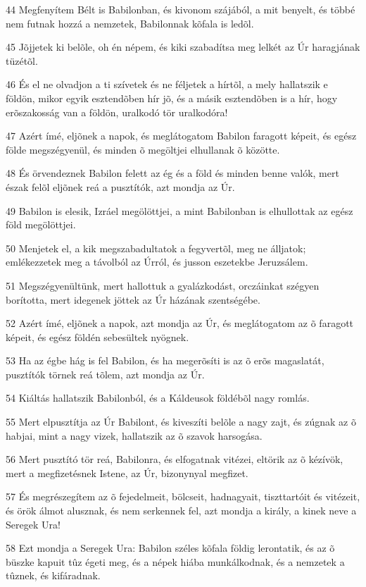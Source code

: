 \par 44 Megfenyítem Bélt is Babilonban, és kivonom szájából, a mit benyelt, és többé nem futnak hozzá a nemzetek, Babilonnak kõfala is ledõl.
\par 45 Jõjjetek ki belõle, oh én népem, és kiki szabadítsa meg lelkét az Úr haragjának tüzétõl.
\par 46 És el ne olvadjon a ti szívetek és ne féljetek a hírtõl, a mely hallatszik e földön, mikor egyik esztendõben hír jõ, és a másik esztendõben is a hír, hogy erõszakosság van a földön, uralkodó tör uralkodóra!
\par 47 Azért ímé, eljõnek a napok, és meglátogatom Babilon faragott képeit, és egész földe megszégyenül, és minden õ megöltjei elhullanak õ közötte.
\par 48 És örvendeznek Babilon felett az ég és a föld és minden benne valók, mert észak felõl eljõnek reá a pusztítók, azt mondja az Úr.
\par 49 Babilon is elesik, Izráel megölöttjei, a mint Babilonban is elhullottak az egész föld megölöttjei.
\par 50 Menjetek el, a kik megszabadultatok a fegyvertõl, meg ne álljatok; emlékezzetek meg a távolból az Úrról, és jusson eszetekbe Jeruzsálem.
\par 51 Megszégyenültünk, mert hallottuk a gyalázkodást, orczáinkat szégyen borította, mert idegenek jöttek az Úr házának szentségébe.
\par 52 Azért ímé, eljõnek a napok, azt mondja az Úr, és meglátogatom az õ faragott képeit, és egész földén sebesültek nyögnek.
\par 53 Ha az égbe hág is fel Babilon, és ha megerõsíti is az õ erõs magaslatát, pusztítók törnek reá tõlem, azt mondja az Úr.
\par 54 Kiáltás hallatszik Babilonból, és a Káldeusok földébõl nagy romlás.
\par 55 Mert elpusztítja az Úr Babilont, és kiveszíti belõle a nagy zajt, és zúgnak az õ habjai, mint a nagy vizek, hallatszik az õ szavok harsogása.
\par 56 Mert pusztító tör reá, Babilonra, és elfogatnak vitézei, eltörik az õ kézívök, mert a megfizetésnek Istene, az Úr, bizonynyal megfizet.
\par 57 És megrészegítem az õ fejedelmeit, bölcseit, hadnagyait, tiszttartóit és vitézeit, és örök álmot alusznak, és nem serkennek fel, azt mondja a király, a kinek neve a Seregek Ura!
\par 58 Ezt mondja a Seregek Ura: Babilon széles kõfala földig lerontatik, és az õ büszke kapuit tûz égeti meg, és a népek hiába munkálkodnak, és a nemzetek a tûznek, és kifáradnak.
